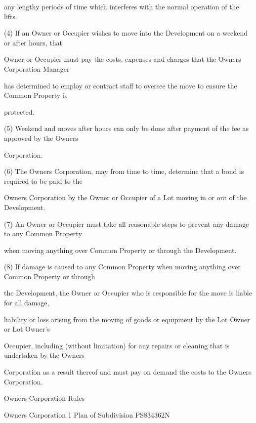\documentclass{article}
\begin{document}
{\fontsize{10.02}{1}any lengthy periods of time which interferes with the normal operation of the lifts. }

{\fontsize{9.962}{1}(4) If an Owner or Occupier wishes to move into the Development on a weekend or after hours, that }

{\fontsize{10.02}{1}Owner or Occupier must pay the costs, expenses and charges that the Owners Corporation Manager }

{\fontsize{10.02}{1}has determined to employ or contract staff to oversee the move to ensure the Common Property is }

{\fontsize{10.02}{1}protected. }

{\fontsize{9.962}{1}(5) Weekend and moves after hours can only be done after payment of the fee as approved by the Owners }

{\fontsize{10.02}{1}Corporation. }

{\fontsize{9.962}{1}(6) The Owners Corporation, may from time to time, determine that a bond is required to be paid to the }

{\fontsize{10.02}{1}Owners Corporation by the Owner or Occupier of a Lot moving in or out of the Development. }

{\fontsize{9.962}{1}(7) An Owner or Occupier must take all reasonable steps to prevent any damage to any Common Property }

{\fontsize{10.02}{1}when moving anything over Common Property or through the Development. }

{\fontsize{9.962}{1}(8) If damage is caused to any Common Property when moving anything over Common Property or through }

{\fontsize{10.02}{1}the Development, the Owner or Occupier who is responsible for the move is liable for all damage, }

{\fontsize{10.02}{1}liability or loss arising from the moving of goods or equipment by the Lot Owner or Lot Owner’s }

{\fontsize{10.02}{1}Occupier, including (without limitation) for any repairs or cleaning that is undertaken by the Owners }

{\fontsize{10.02}{1}Corporation as a result thereof and must pay on demand the costs to the Owners Corporation. }

\newpage





{\fontsize{9}{1}Owners Corporation Rules }

{\fontsize{9}{1}Owners Corporation 1 Plan of Subdivision PS834362N }
\end{document}
